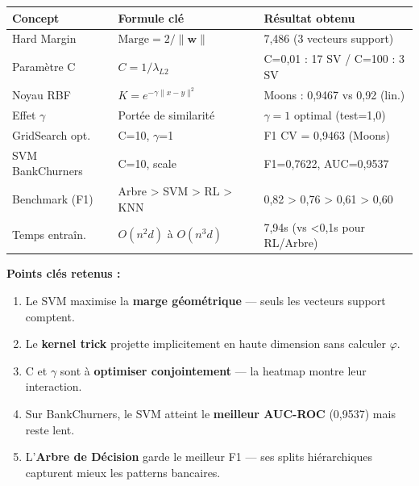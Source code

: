 \documentclass[12pt,a4paper]{article}
\begin{document}
\begin{tcolorbox}[
  enhanced, breakable,
  colback=darkblue!5,
  colframe=darkblue,
  title={\textbf{Bilan du TD 6 — Support Vector Machines}},
  fonttitle=\bfseries\normalsize\color{white},
  colbacktitle=darkblue,
  boxrule=1pt
]
\setlength{\tabcolsep}{8pt}
\renewcommand{\arraystretch}{1.25}
\begin{center}
\begin{tabular}{p{3.5cm} p{4.5cm} p{5cm}}
\toprule
\textbf{Concept} & \textbf{Formule clé} & \textbf{Résultat obtenu} \\
\midrule
Hard Margin & $\text{Marge} = 2/\|\mathbf{w}\|$ & 7{,}486 (3 vecteurs support) \\
Paramètre C & $C = 1/\lambda_{L2}$ & C=0{,}01 : 17 SV / C=100 : 3 SV \\
Noyau RBF & $K = e^{-\gamma\|x-y\|^2}$ & Moons : 0{,}9467 vs 0{,}92 (lin.) \\
Effet $\gamma$ & Portée de similarité & $\gamma=1$ optimal (test=1{,}0) \\
GridSearch opt. & C=10, $\gamma$=1 & F1 CV = 0{,}9463 (Moons) \\
SVM BankChurners & C=10, scale & F1=0{,}7622, AUC=0{,}9537 \\
Benchmark (F1) & Arbre > SVM > RL > KNN & 0{,}82 > 0{,}76 > 0{,}61 > 0{,}60 \\
Temps entraîn. & $O(n^2 d)$ à $O(n^3 d)$ & 7{,}94s (vs <0{,}1s pour RL/Arbre) \\
\bottomrule
\end{tabular}
\end{center}

\medskip
\textbf{Points clés retenus :}
\begin{enumerate}[leftmargin=2em]
  \item Le SVM maximise la \textbf{marge géométrique} — seuls les vecteurs support comptent.
  \item Le \textbf{kernel trick} projette implicitement en haute dimension sans calculer $\varphi$.
  \item C et $\gamma$ sont à \textbf{optimiser conjointement} — la heatmap montre leur interaction.
  \item Sur BankChurners, le SVM atteint le \textbf{meilleur AUC-ROC} (0{,}9537) mais reste lent.
  \item L'\textbf{Arbre de Décision} garde le meilleur F1 — ses splits hiérarchiques capturent mieux les patterns bancaires.
\end{enumerate}
\end{tcolorbox}
\end{document}
